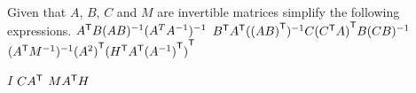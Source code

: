 

\begin{Exercise}[
name={},
title={}, 
difficulty=0,
origin={\cite{YL, MB}}]
Given that $A$, $B$, $C$ and $M$  are invertible matrices simplify the following expressions.
\Question ${{A}^{\mathsf{T}}}B(AB)^{-1}(A^TA^{-1})^{-1}$
\Question ${{B}^{\mathsf{T}}}{{A}^{\mathsf{T}}}({{(AB)}^{\mathsf{T}}})^{-1}C{{({{C}^{\mathsf{T}}}A)}^{\mathsf{T}}}B(CB)^{-1}$
\Question $({{A}^{\mathsf{T}}}M^{-1})^{-1}{{(A^2)}^{\mathsf{T}}}{{({{H}^{\mathsf{T}}}{{A}^{\mathsf{T}}}{{(A^{-1})}^{\mathsf{T}}})}^{\mathsf{T}}}$ 
\end{Exercise}

\begin{Answer}
\Question $I$
\Question $C{{A}^{\mathsf{T}}}$
\Question $M{{A}^{\mathsf{T}}}H$
\end{Answer}
